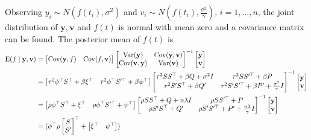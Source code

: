 Observing $y_i\sim N(f (t_i),\sigma^2)$ and $v_i\sim N(f (t_i),\frac{\sigma^2}{\gamma})$, $i=1,\ldots,n$, the joint distribution of $\mathbf{y},\mathbf{v}$ and $f(t)$ is normal with mean zero and a covariance matrix can be found. The posterior mean of $f(t)$ is 
\begin{align}\label{GPrhoeq}
\begin{split}
\E (f \mid  \mathbf{\mathbf{y}},\mathbf{v}) & =
\begin{bmatrix}
\Cov (\mathbf{y},f) & \Cov (f,\mathbf{\mathbf{v}})
\end{bmatrix}\begin{bmatrix}
\Var(\mathbf{y}) & \Cov(\mathbf{y},\mathbf{v})\\
\Cov(\mathbf{v},\mathbf{y}) & \Var(\mathbf{v})
\end{bmatrix}^{-1}\begin{bmatrix}
\mathbf{y}\\\mathbf{v}
\end{bmatrix}\\
&=
\begin{bmatrix}
\tau^2 \phi^\top S^\top+\beta \xi^\top & \tau^2  \phi^\top S'^\top+\beta \psi^\top 
\end{bmatrix}\begin{bmatrix}
\tau^2 SS^\top+\beta Q+\sigma^2 I& \tau^2 SS'^\top+\beta P\\
\tau^2 S'S^\top+\beta Q'& \tau^2 S'S'^\top+\beta P'+\frac{\sigma^2}{\gamma}I
\end{bmatrix}^{-1}\begin{bmatrix}
\mathbf{y}\\\mathbf{v}
\end{bmatrix}\\
&=
\begin{bmatrix}
\rho\phi^\top S^\top+ \xi^\top & \rho\phi^\top S'^\top+\psi^\top
\end{bmatrix}\begin{bmatrix}
\rho SS^\top+Q+n\lambda I& \rho SS'^\top+P\\
\rho S'S^\top+Q'& \rho S'S'^\top+P'+\frac{n\lambda}{\gamma}I
\end{bmatrix}^{-1}\begin{bmatrix}
\mathbf{y}\\\mathbf{v}
\end{bmatrix}\\
&=(\phi^\top \rho 
\begin{bmatrix} S\\ S' \end{bmatrix}^\top + \begin{bmatrix} \xi^\top & \psi^\top\end{bmatrix})

\end{split}
\end{align}

